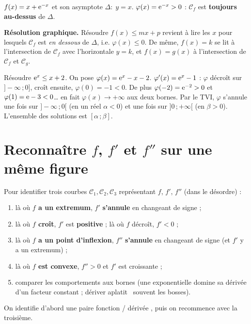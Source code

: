 \begin{exemple}
	$f(x)=x+\mathrm{e}^{-x}$ et son asymptote $\Delta:\;y=x$.
	$\varphi(x)=\mathrm{e}^{-x}>0$ : $\mathcal C_f$ est \textbf{toujours au-dessus} de
	$\Delta$.
\end{exemple}

\begin{astucebac}
	\textbf{Résolution graphique.} Résoudre $f(x)\leq mx+p$ revient à lire les
	$x$ pour lesquels $\mathcal C_f$ est \emph{en dessous} de $\Delta$, i.e.
	$\varphi(x)\leq 0$. De même, $f(x)=k$ se lit à l'intersection de
	$\mathcal C_f$ avec l'horizontale $y=k$, et $f(x)=g(x)$ à l'intersection de
	$\mathcal C_f$ et $\mathcal C_g$.
\end{astucebac}

\begin{exemple}
	Résoudre $\mathrm{e}^{x}\leq x+2$. On pose $\varphi(x)=\mathrm{e}^{x}-x-2$.
	$\varphi'(x)=\mathrm{e}^{x}-1$ : $\varphi$ décroît sur $]-\infty\,;0]$, croît
	ensuite, $\varphi(0)=-1<0$. De plus $\varphi(-2)=\mathrm{e}^{-2}>0$ et
	$\varphi(1)=\mathrm{e}-3<0$… en fait $\varphi(x)\to+\infty$ aux deux bornes.
	Par le TVI, $\varphi$ s'annule une fois sur $]-\infty\,;0[$ (en un réel
	$\alpha<0$) et une fois sur $]0\,;+\infty[$ (en $\beta>0$). L'ensemble des
	solutions est $[\alpha\,;\beta]$.
\end{exemple}


\section{Reconnaître \texorpdfstring{$f$}{f}, \texorpdfstring{$f'$}{f'} et \texorpdfstring{$f''$}{f''} sur une même figure}

\begin{methode}
	Pour identifier trois courbes $\mathcal C_1,\mathcal C_2,\mathcal C_3$
	représentant $f$, $f'$, $f''$ (dans le désordre) :
	\begin{enumerate}
		\item là où \textbf{$f$ a un extremum}, $f'$ \textbf{s'annule} en
		changeant de signe ;
		\item là où \textbf{$f$ croît}, $f'$ est \textbf{positive} ; là où $f$
		décroît, $f'<0$ ;
		\item là où \textbf{$f$ a un point d'inflexion}, $f''$ \textbf{s'annule}
		en changeant de signe (et $f'$ y a un extremum) ;
		\item là où \textbf{$f$ est convexe}, $f''>0$ et $f'$ est croissante ;
		\item comparer les comportements aux bornes (une exponentielle domine sa
		dérivée d'un facteur constant ; dériver \og aplatit \fg\ souvent les
		bosses).
	\end{enumerate}
	On identifie d'abord une paire \og fonction / dérivée \fg, puis on
	recommence avec la troisième.
\end{methode}

